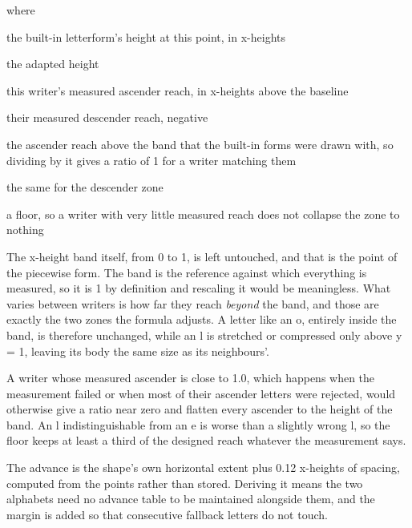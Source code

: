 \noindent where
\begin{description}[leftmargin=2.4em,style=nextline,font=\normalfont\ttfamily]\setlength\itemsep{1pt}
  \item[{$y$}] \normalfont the built-in letterform's height at this point, in x-heights
  \item[{$y'$}] \normalfont the adapted height
  \item[{$\mathrm{asc}$}] \normalfont this writer's measured ascender reach, in x-heights above the baseline
  \item[{$\mathrm{desc}$}] \normalfont their measured descender reach, negative
  \item[{$0.75$}] \normalfont the ascender reach above the band that the built-in forms were drawn with, so dividing by it gives a ratio of 1 for a writer matching them
  \item[{$0.55$}] \normalfont the same for the descender zone
  \item[{$\max(0.35,\cdot)$}] \normalfont a floor, so a writer with very little measured reach does not collapse the zone to nothing
\end{description}
The x-height band itself, from 0 to 1, is left untouched, and that is the point of the piecewise form. The band is the reference against which everything is measured, so it is 1 by definition and rescaling it would be meaningless. What varies between writers is how far they reach \emph{beyond} the band, and those are exactly the two zones the formula adjusts. A letter like an o, entirely inside the band, is therefore unchanged, while an l is stretched or compressed only above y = 1, leaving its body the same size as its neighbours'.


A writer whose measured ascender is close to 1.0, which happens when the measurement failed or when most of their ascender letters were rejected, would otherwise give a ratio near zero and flatten every ascender to the height of the band. An l indistinguishable from an e is worse than a slightly wrong l, so the floor keeps at least a third of the designed reach whatever the measurement says.


The advance is the shape's own horizontal extent plus 0.12 x-heights of spacing, computed from the points rather than stored. Deriving it means the two alphabets need no advance table to be maintained alongside them, and the margin is added so that consecutive fallback letters do not touch.



